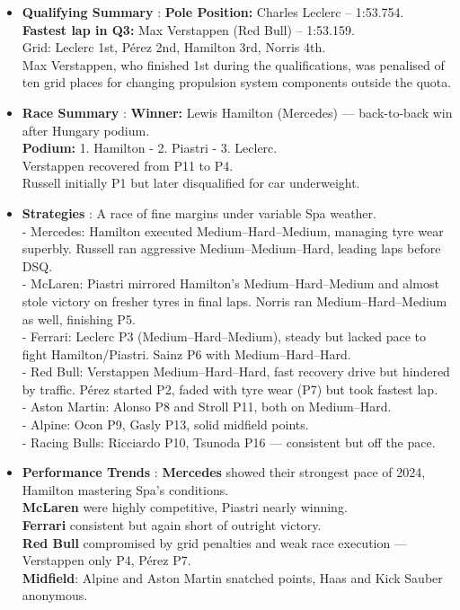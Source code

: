 \begin{itemize}
    \item \textbf{Qualifying Summary} : \textbf{Pole Position:} Charles Leclerc – 1:53.754. \\
    \textbf{Fastest lap in Q3:} Max Verstappen (Red Bull) – 1:53.159. \\
    Grid: Leclerc 1st, Pérez 2nd, Hamilton 3rd, Norris 4th.\\
    Max Verstappen, who finished 1st during the qualifications, was penalised of ten grid places for changing propulsion system components outside the quota.
    
    \item \textbf{Race Summary} : \textbf{Winner:} Lewis Hamilton (Mercedes) — back-to-back win after Hungary podium. \\
    \textbf{Podium:} 1. Hamilton - 2. Piastri - 3. Leclerc. \\
    Verstappen recovered from P11 to P4. \\
    Russell initially P1 but later disqualified for car underweight.\\
    
    \item \textbf{Strategies} : A race of fine margins under variable Spa weather. \\
    - Mercedes: Hamilton executed Medium–Hard–Medium, managing tyre wear superbly. Russell ran aggressive Medium–Medium–Hard, leading laps before DSQ. \\
    - McLaren: Piastri mirrored Hamilton’s Medium–Hard–Medium and almost stole victory on fresher tyres in final laps. Norris ran Medium–Hard–Medium as well, finishing P5. \\
    - Ferrari: Leclerc P3 (Medium–Hard–Medium), steady but lacked pace to fight Hamilton/Piastri. Sainz P6 with Medium–Hard–Hard. \\
    - Red Bull: Verstappen Medium–Hard–Hard, fast recovery drive but hindered by traffic. Pérez started P2, faded with tyre wear (P7) but took fastest lap. \\
    - Aston Martin: Alonso P8 and Stroll P11, both on Medium–Hard. \\
    - Alpine: Ocon P9, Gasly P13, solid midfield points. \\
    - Racing Bulls: Ricciardo P10, Tsunoda P16 — consistent but off the pace.
    
    \item \textbf{Performance Trends} : \textbf{Mercedes} showed their strongest pace of 2024, Hamilton mastering Spa’s conditions. \\
    \textbf{McLaren} were highly competitive, Piastri nearly winning. \\
    \textbf{Ferrari} consistent but again short of outright victory. \\
    \textbf{Red Bull} compromised by grid penalties and weak race execution — Verstappen only P4, Pérez P7. \\
    \textbf{Midfield}: Alpine and Aston Martin snatched points, Haas and Kick Sauber anonymous.
    

\end{itemize}
